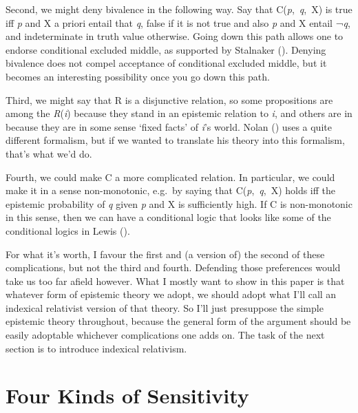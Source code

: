 \documentclass[
  11pt,
  letterpaper,
  DIV=11,
  numbers=noendperiod,
  twoside]{scrartcl}
\begin{document}
Second, we might deny bivalence in the following way. Say that
C(\emph{p},~\emph{q},~X) is true iff \emph{p} and X a priori entail that
\emph{q}, false if it is not true and also \emph{p} and X entail
¬\emph{q}, and indeterminate in truth value otherwise. Going down this
path allows one to endorse conditional excluded middle, as supported by
Stalnaker (). Denying bivalence does
not compel acceptance of conditional excluded middle, but it becomes an
interesting possibility once you go down this path.

Third, we might say that R is a disjunctive relation, so some
propositions are among the \emph{R}(\emph{i}) because they stand in an
epistemic relation to \emph{i}, and others are in because they are in
some sense `fixed facts' of \emph{i}'s world. Nolan
() uses a quite different formalism, but
if we wanted to translate his theory into this formalism, that's what
we'd do.

Fourth, we could make C a more complicated relation. In particular, we
could make it in a sense non-monotonic, e.g.~by saying that
C(\emph{p},~\emph{q},~X) holds iff the epistemic probability of \emph{q}
given \emph{p} and X is sufficiently high. If C is non-monotonic in this
sense, then we can have a conditional logic that looks like some of the
conditional logics in Lewis ().

For what it's worth, I favour the first and (a version of) the second of
these complications, but not the third and fourth. Defending those
preferences would take us too far afield however. What I mostly want to
show in this paper is that whatever form of epistemic theory we adopt,
we should adopt what I'll call an indexical relativist version of that
theory. So I'll just presuppose the simple epistemic theory throughout,
because the general form of the argument should be easily adoptable
whichever complications one adds on. The task of the next section is to
introduce indexical relativism.

\section{Four Kinds of Sensitivity}\label{four-kinds-of-sensitivity}
\end{document}
